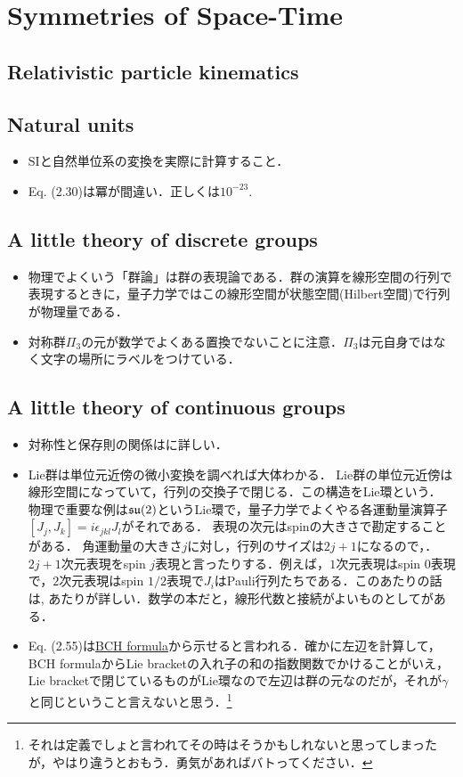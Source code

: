 \section{Symmetries of Space-Time}
\subsection{Relativistic particle kinematics}
\subsection{Natural units}
\begin{itemize}
		\item SIと自然単位系の変換を実際に計算すること．

		\item Eq. (2.30)は冪が間違い．正しくは$10^{-23} $.
\end{itemize}
\subsection{A little theory of discrete groups}
\begin{itemize}
		\item 物理でよくいう「群論」は群の表現論である．群の演算を線形空間の行列で表現するときに，量子力学ではこの線形空間が状態空間(Hilbert空間)で行列が物理量である．
		\item 対称群$\Pi_3 $の元が数学でよくある置換でないことに注意．$\Pi_3 $は元自身ではなく文字の場所にラベルをつけている．
\end{itemize}
\subsection{A little theory of continuous groups}
\begin{itemize}
		\item 対称性と保存則の関係は\cite[Chap.10, Sec.4]{BB17130464}に詳しい．
		\item Lie群は単位元近傍の微小変換を調べれば大体わかる．
				Lie群の単位元近傍は線形空間になっていて，行列の交換子で閉じる．この構造をLie環という．
				物理で重要な例は$\mathfrak{su}(2) $というLie環で，量子力学でよくやる各運動量演算子$[J_j, J_k] = i\epsilon_{jkl}J_l $がそれである．
				表現の次元はspinの大きさで勘定することがある．
				角運動量の大きさ$j $に対し，行列のサイズは$2j + 1 $になるので，．$2j+1 $次元表現をspin $j $表現と言ったりする．例えば，$1 $次元表現はspin $0 $表現で，$2 $次元表現はspin $1/2 $表現で$J_i $はPauli行列たちである．このあたりの話は\cite[Chap.3]{BB03663366}, \cite{BN10398292}あたりが詳しい．数学の本だと，線形代数と接続がよいものとして\cite{BC13565134}がある．
		\item Eq. (2.55)は\href{https://en.wikipedia.org/wiki/Baker%E2%80%93Campbell%E2%80%93Hausdorff_formula}{BCH formula}から示せると言われる．確かに左辺を計算して，BCH formulaからLie bracketの入れ子の和の指数関数でかけることがいえ，Lie bracketで閉じているものがLie環なので左辺は群の元なのだが，それが$\gamma $と同じということ言えないと思う．\footnote{それは定義でしょと言われてその時はそうかもしれないと思ってしまったが，やはり違うとおもう．勇気があればバトってください．}
\end{itemize}
